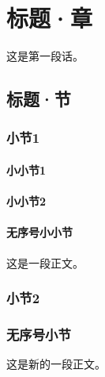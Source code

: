 
\chapter{标题·章}

这是第一段话。


\section{标题·节}

\subsection{小节1}

\subsubsection{小小节1}
\subsubsection{小小节2}
\subsubsection*{无序号小小节}
这是一段正文。

\subsection{小节2}


\subsection*{无序号小节}

这是新的一段正文。
